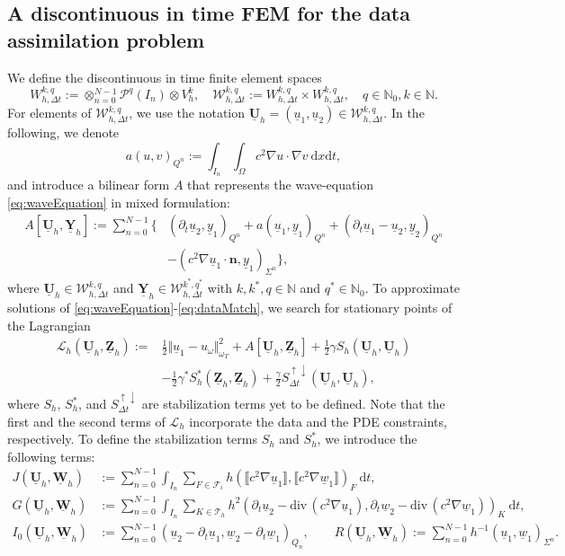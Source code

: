 \documentclass[sn-mathphys-num]{sn-jnl}
\numberwithin{equation}{section}
\newcommand{\jump}[1]{\llbracket#1\rrbracket}
\newcommand{\cL}{\mathcal{L}}
\renewcommand{\div}{\mathrm{div}\,}  %
\newcommand{\dT}{\mathrm{d}t}
\newcommand{\dX}{\mathrm{d}x}
\newcommand{\FullyDiscrSpace}[2]{ W^{ {#1},{#2}}_{h, \Delta t  } }
\newcommand{\ProdFullyDiscrSpace}[2]{ \mathcal{W}^{ {#1},{#2}}_{h, \Delta t  } }
\newcommand{\Uh}{\underline{\mathbf{U}}_h}
\newcommand{\Yh}{\underline{\mathbf{Y}}_h}
\newcommand{\Zh}{\underline{\mathbf{Z}}_h}
\newcommand{\Wh}{\underline{\mathbf{W}}_h}
\newcommand{\ul}{\underline{u}}
\newcommand{\yl}{\underline{y}}
\newcommand{\wl}{\underline{w}}
\newcommand{\Sud}{S^{\uparrow \downarrow}_{\Delta t}}
\newcommand{\dt}{\partial_t}
\begin{document}
\subsection{A discontinuous in time FEM for the data assimilation problem}\label{sec:method}
\noindent We define the discontinuous in time finite element spaces 
\begin{equation}
    \FullyDiscrSpace{k}{q} := \otimes_{n = 0}^{N-1} \mathcal{P}^q(I_n) \otimes V_h^k, \quad \ProdFullyDiscrSpace{k}{q} :=  \FullyDiscrSpace{k}{q} \times \FullyDiscrSpace{k}{q}, \quad q \in \mathbb{N}_0, k \in \mathbb{N}. 
\end{equation}
For elements of $\ProdFullyDiscrSpace{k}{q}$, we use the notation $\Uh = (\ul_1,\ul_2) \in \ProdFullyDiscrSpace{k}{q}$. In the following, we denote
\begin{equation*}
    a(u,v)_{Q^n} := \int_{I_n} \int_{\Omega} c^2 \nabla u \cdot \nabla v \ \dX \dT,
\end{equation*}
and introduce a bilinear form $A$ that represents the wave-equation \eqref{eq:waveEquation} in mixed formulation:  
\begin{equation}
    \begin{aligned}
        A[\Uh,\Yh] := \sum_{n = 0}^{N -1} \Big\{ &(\dt \ul_2, \yl_1)_{Q^n} + a(\ul_1,\yl_1)_{Q^n} + (\dt \ul_1 - \ul_2,\yl_2)_{Q^n} \\
        &- (c^2 \nabla \ul_1 \cdot \mathbf{n}, \yl_1)_{\Sigma^n} \Big\},
    \end{aligned}
\end{equation} 
where $\Uh \in \ProdFullyDiscrSpace{k}{q}$ and $\Yh \in \ProdFullyDiscrSpace{k^\ast}{q^\ast}$ with $k, k^\ast, q \in \mathbb{N}$ and $q^\ast \in \mathbb{N}_0$. 
To approximate solutions of \eqref{eq:waveEquation}-\eqref{eq:dataMatch}, we search for stationary points of the Lagrangian 
\begin{align*}
    \cL_h (\Uh, \Zh) := &\frac{1}{2} \Vert \ul_1 - u_{\omega} \Vert^2_{\omega_T} + A[\Uh,\Zh] + \frac{1}{2} \gamma S_h(\Uh,\Uh) \\
    &- \frac{1}{2} \gamma^\ast S_h^\ast(\Zh,\Zh) + \frac{\gamma}{2} \Sud(\Uh,\Uh),
\end{align*}
where $S_h$, $S_h^\ast$, and $\Sud$ are stabilization terms yet to be defined. Note that the first and the second terms of $\cL_h$ incorporate the data and the PDE constraints, respectively. To define the stabilization terms $S_h$ and $S_h^\ast$, we introduce the following terms: 
\begin{align*}
    J(\Uh,\Wh) &:= \sum_{n = 0}^{N -1} \int_{I_n} \sum_{F \in \mathcal{F}_i} h (\jump{c^2 \nabla \ul_1}, \jump{c^2 \nabla \wl_1})_F \ \dT, \\
    G(\Uh,\Wh) &:= \sum_{n = 0}^{N -1} \int_{I_n} \sum_{K \in \mathcal{T}_h} h^2 (\dt \ul_2 - \div (c^2 \nabla \ul_1),\dt \wl_2 -\div( c^2 \nabla \wl_1))_K \ \dT, \\
    I_0(\Uh,\Wh) &:= \sum_{n = 0}^{N -1} (\ul_2 - \dt \ul_1, \wl_2-\dt \wl_1)_{Q_n}, \qquad 
    R(\Uh,\Wh) := \sum_{n = 0}^{N -1} h^{-1} (\ul_1,\wl_1)_{\Sigma^n}. 
\end{align*}
\end{document}
